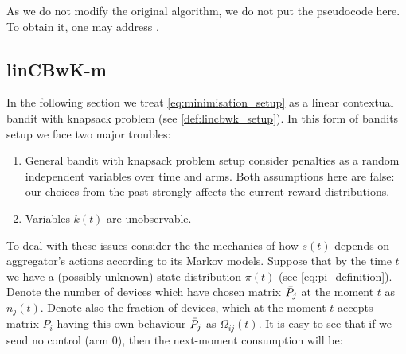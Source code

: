 As we do not modify the original algorithm, we do not put the pseudocode here. To obtain it, one may address \cite{Badanidiyuru2013}. 

\subsection{linCBwK-m}

In the following section we treat \ref{eq:minimisation_setup} as a linear contextual bandit with knapsack problem (see \ref{def:lincbwk_setup}). In this form of bandits setup we face two major troubles: 




\begin{enumerate}
    \item General bandit with knapsack problem setup  consider penalties as a random independent variables over time and arms. Both assumptions here are false: our choices from the past strongly affects the current reward distributions.
    \item Variables $k(t)$ are unobservable.
\end{enumerate} 

To deal with these issues consider the the mechanics of how $s(t)$ depends on aggregator's actions according to its Markov models. Suppose that by the time $t$ we have a (possibly unknown) state-distribution $\pi(t)$ (see \ref{eq:pi_definition}). Denote the number of devices which have chosen matrix $\bar P_j$ at the moment $t$ as $n_j(t)$. Denote also the fraction of devices, which at the moment $t$ accepts matrix $P_i$ having this own behaviour $\bar P_j$ as $\Omega_{ij}(t)$. It is easy to see that if we send no control (arm $0$), then the next-moment consumption will be:

